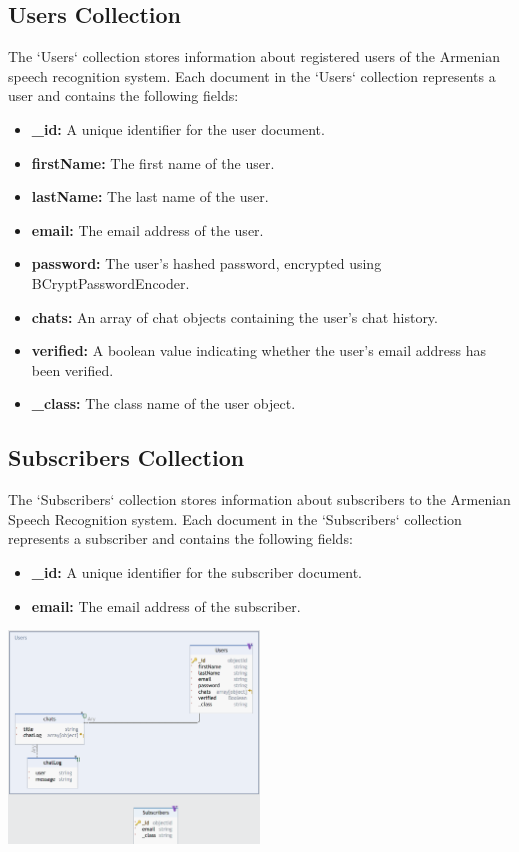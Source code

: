 \documentclass[conference]{IEEEtran}
\begin{document}
\subsection{Users Collection}

The `Users` collection stores information about registered users of the Armenian speech recognition system. Each document in the `Users` collection represents a user and contains the following fields:

\begin{itemize}
    \item \textbf{\_id:} A unique identifier for the user document.
    \item \textbf{firstName:} The first name of the user.
    \item \textbf{lastName:} The last name of the user.
    \item \textbf{email:} The email address of the user.
    \item \textbf{password:} The user's hashed password, encrypted using BCryptPasswordEncoder.
    \item \textbf{chats:} An array of chat objects containing the user's chat history.
    \item \textbf{verified:} A boolean value indicating whether the user's email address has been verified.
    \item \textbf{\_class:} The class name of the user object.
\end{itemize}

\subsection{Subscribers Collection}

The `Subscribers` collection stores information about subscribers to the Armenian Speech Recognition system. Each document in the `Subscribers` collection represents a subscriber and contains the following fields:

\begin{itemize}
    \item \textbf{\_id:} A unique identifier for the subscriber document.
    \item \textbf{email:} The email address of the subscriber.
\end{itemize}

\begin{center}
    \centering
    \includegraphics[width=0.5\textwidth]{DB_Structure.png}
    \label{fig:database_structure}
\end{center}
\end{document}
